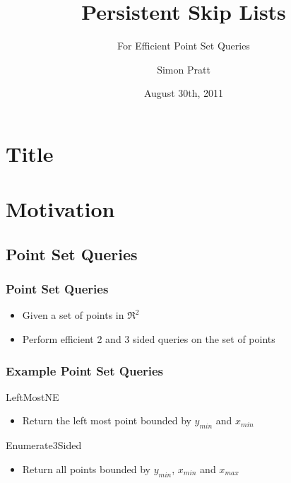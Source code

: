 \documentclass{beamer}
\title{Persistent Skip Lists}
\subtitle{For Efficient Point Set Queries}
\author{Simon Pratt}
\institute[Carleton University]
{
  Carleton University
}
\date{August 30th, 2011}
\begin{document}
\section{Title}
\begin{frame}
  \titlepage
\end{frame}




\section{Motivation}

\subsection{Point Set Queries}

\begin{frame}
  \frametitle{Point Set Queries}

  \begin{itemize}
  \item
    Given a set of points in $\Re^2$
  \item
    Perform efficient 2 and 3 sided queries on the set of points
  \end{itemize}
\end{frame}

\begin{frame}
  \frametitle{Example Point Set Queries}

  LeftMostNE

  \begin{itemize}
  \item
    Return the left most point bounded by $y_{min}$ and $x_{min}$
  \end{itemize}

    Enumerate3Sided

  \begin{itemize}
  \item
    Return all points bounded by $y_{min}$, $x_{min}$ and $x_{max}$
  \end{itemize}

\end{frame}
\end{document}
